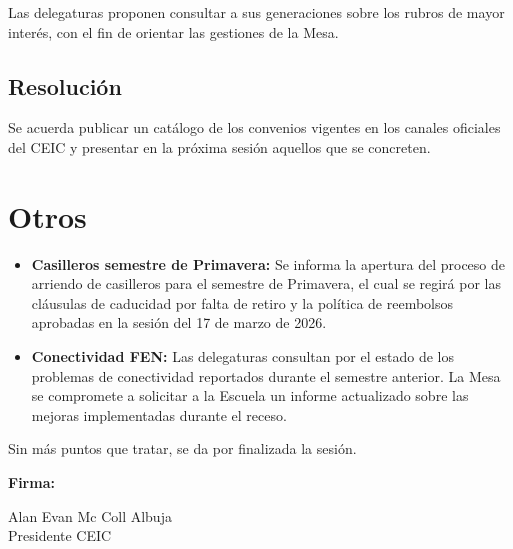 \documentclass[12pt,letterpaper]{article}
\begin{document}
Las delegaturas proponen consultar a sus generaciones sobre los rubros de mayor interés, con el fin de orientar las gestiones de la Mesa.

\subsection{Resolución}

Se acuerda publicar un catálogo de los convenios vigentes en los canales oficiales del CEIC y presentar en la próxima sesión aquellos que se concreten.

\section{Otros}

\begin{itemize}
  \item \textbf{Casilleros semestre de Primavera:} Se informa la apertura del proceso de arriendo de casilleros para el semestre de Primavera, el cual se regirá por las cláusulas de caducidad por falta de retiro y la política de reembolsos aprobadas en la sesión del 17 de marzo de 2026.
  \item \textbf{Conectividad FEN:} Las delegaturas consultan por el estado de los problemas de conectividad reportados durante el semestre anterior. La Mesa se compromete a solicitar a la Escuela un informe actualizado sobre las mejoras implementadas durante el receso.
\end{itemize}

\vspace{0.5em}

Sin más puntos que tratar, se da por finalizada la sesión.

\vspace{4em}

\noindent\textbf{Firma:}

\vspace{3em}

\noindent Alan Evan Mc Coll Albuja\\
Presidente CEIC
\end{document}
